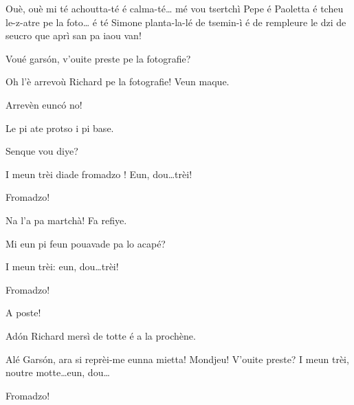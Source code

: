 \begin{drama}
\Joellespeaks Ouè, ouè mi té achoutta-té é calma-té\ldots {} mé vou tsertchì Pepe é Paoletta é tcheu le-z-atre pe la foto\ldots {} é té Simone planta-la-lé de tsemin-ì é de rempleure le dzi de seucro que aprì san pa iaou van!


\Fotografespeaks Voué gars\'on, v'ouite preste pe la fotografie?

\Joelspeaks Oh l'è arrevoù Richard pe la fotografie! Veun maque.

\Joellespeaks {} Arrevèn euncó no!


\Fotografespeaks Le pi ate protso i pi base.

\Joelspeaks Senque vou diye?

\Fotografespeaks I meun trèi diade fromadzo \formaggio ! Eun, dou\ldots trèi!

\Tcheuttespeaks {} Fromadzo!

\Fotografespeaks Na l'a pa martchà! Fa refiye.

\Cimaspeaks Mi eun pi feun pouavade pa lo acapé?

\Fotografespeaks I meun trèi: eun, dou\ldots trèi!

\Tcheuttespeaks {} Fromadzo!

\Fotografespeaks A poste!


\Joelspeaks Ad\'on Richard mersì de totte é a la prochène.


\Joelspeaks Alé Gars\'on, ara si reprèi-me eunna mietta! Mondjeu! V'ouite preste? I meun trèi, noutre motte\ldots eun, dou\ldots


\Fotografespeaks{} Fromadzo!


\end{drama}

